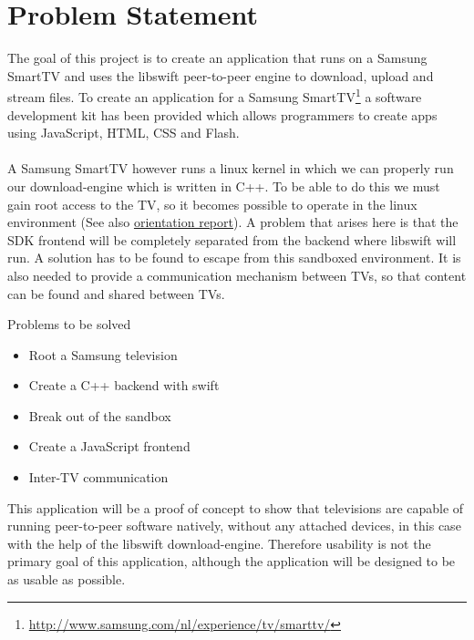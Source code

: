\chapter{Problem Statement}
\label{sec:problems}
The goal of this project is to create an application that runs on a Samsung SmartTV and uses the libswift peer-to-peer engine to download, upload and stream files. To create an application for a Samsung SmartTV\footnote{\url{http://www.samsung.com/nl/experience/tv/smarttv/}} a software development kit has been provided which allows programmers to create apps using JavaScript, HTML, CSS and Flash.\\\\
A Samsung SmartTV however runs a linux kernel in which we can properly run our download-engine which is written in C++. To be able to do this we must gain root access to the TV, so it becomes possible to operate in the linux environment (See also \hyperref[sec:orientation]{orientation report}). A problem that arises here is that the SDK frontend will be completely separated from the backend where libswift will run. A solution has to be found to escape from this sandboxed environment. It is also needed to provide a communication mechanism between TV\textquotesingle s,
so that content can be found and shared between TV\textquotesingle s.

Problems to be solved
\begin{itemize}
\item Root a Samsung television
\item Create a C++ backend with swift
\item Break out of the sandbox
\item Create a JavaScript frontend
\item Inter-TV communication
\end{itemize}

This application will be a proof of concept to show that televisions are capable of running peer-to-peer software natively, without any attached
devices, in this case with the help of the libswift download-engine. Therefore usability is not the primary goal of this application, 
although the application will be designed to be as usable as possible.
